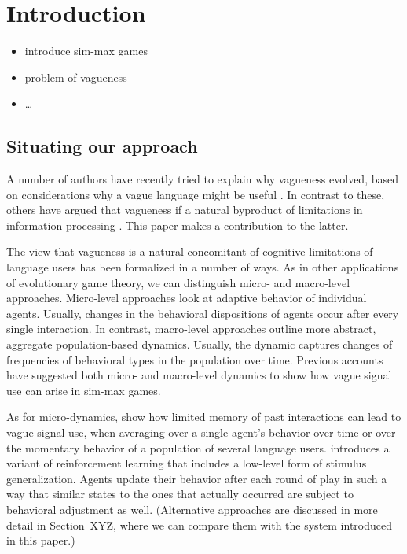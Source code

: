\section{Introduction}

\begin{itemize}
\item introduce sim-max games
\item problem of vagueness \citep{Lipman2009:Why-is-Language}
\item \dots
\end{itemize}

\subsection{Situating our approach}

A number of authors have recently tried to explain why vagueness
evolved, based on considerations why a vague language might be useful
\citep[e.g.][]{Jaegherde-Jaegher2003:A-Game-Theoreti,Deemter2009:Utility-and-Lan,Jaegherde-JaegherRooijvan-Rooij2010:Strategic-Vague,BlumeBoard2013:Intentional-Vag}. In
contrast to these, others have argued that vagueness if a natural
byproduct of limitations in information processing
\citep[e.g.][]{FrankeJager2010:Vagueness-Signa,OConnor2013:The-Evolution-o}. This
paper makes a contribution to the latter.

The view that vagueness is a natural concomitant of cognitive
limitations of language users has been formalized in a number of
ways. As in other applications of evolutionary game theory, we can
distinguish micro- and macro-level approaches. Micro-level approaches
look at adaptive behavior of individual agents. Usually, changes in
the behavioral dispositions of agents occur after every single
interaction. In contrast, macro-level approaches outline more
abstract, aggregate population-based dynamics. Usually, the dynamic
captures changes of frequencies of behavioral types in the population
over time. Previous accounts have suggested both micro- and
macro-level dynamics to show how vague signal use can arise in sim-max
games.

As for micro-dynamics, \citet{FrankeJager2010:Vagueness-Signa} show
how limited memory of past interactions can lead to vague signal use,
when averaging over a single agent's behavior over time or over the
momentary behavior of a population of several language
users. \citet{OConnor2013:The-Evolution-o} introduces a variant of
reinforcement learning that includes a low-level form of stimulus
generalization. Agents update their behavior after each round of play
in such a way that similar states to the ones that actually occurred
are subject to behavioral adjustment as well. (Alternative approaches
are discussed in more detail in Section~XYZ, where we can compare them
with the system introduced in this paper.)

